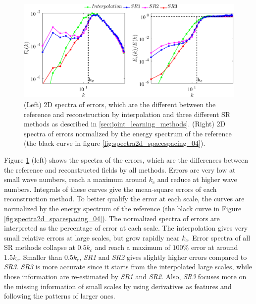 \begin{figure}
	\centering
	\includegraphics[width=\textwidth]{./images/DL/SR_sspacing04/downsampling/errspectra2d_nonnormalized_normalized_timespacing_06_spacespacing_04.eps}
	\caption{(Left) 2D spectra of errors, which are the different between the reference and reconstruction by interpolation and three different SR methods as described in \ref{sec:joint_learning_methods}. (Right) 2D spectra of errors normalized by the energy spectrum of the reference (the black curve in figure \ref{fig:spectra2d_spacespacing_04}).}
	\label{fig:errspectra2d_nonnormalized_normalized_timespacing_06_spacespacing_04}
\end{figure}

Figure \ref{fig:errspectra2d_nonnormalized_normalized_timespacing_06_spacespacing_04} (left) shows the spectra of the errors, which are the differences between the reference and reconstructed fields by all methods. Errors are very low at small wave numbers, reach a maximum around $ k_c $ and reduce at higher wave numbers. Integrals of these curves give the mean-square errors of each reconstruction method. To better qualify the error at each scale, the curves are normalized by the energy spectrum of the reference (the black curve in Figure \ref{fig:spectra2d_spacespacing_04}). The normalized spectra of errors are interpreted as the percentage of error at each scale. The interpolation gives very small relative errors at large scales, but grow rapidly near $ k_c $. Error spectra of all SR methods collapse at $ 0.5k_c $ and reach a maximum of $ 100 \% $ error at around $ 1.5k_c $. Smaller than $ 0.5k_c $, \textit{SR1} and \textit{SR2} gives slightly higher errors compared to \textit{SR3}. \textit{SR3} is more accurate since it starts from the interpolated large scales, while those information are re-estimated by \textit{SR1} and \textit{SR2}. Also, \textit{SR3} focuses more on the missing information of small scales by using derivatives as features and following the patterns of larger ones. 

